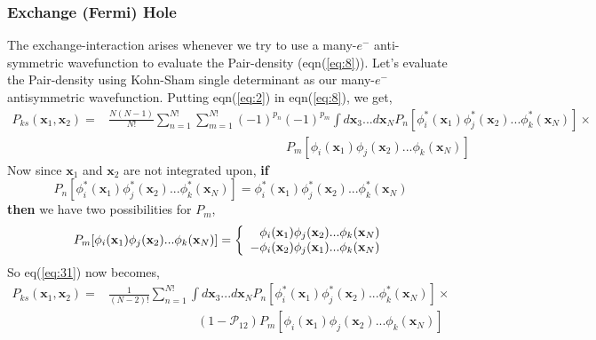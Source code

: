 \documentclass{article}
\begin{document}
\begin{Large}
\begin{flushleft}
   \subsubsection*{\Large{Exchange (Fermi) Hole}}
   The exchange-interaction arises whenever we try to use a many-$e^-$ anti-symmetric wavefunction to evaluate the Pair-density (eqn(\ref{eq:8})). Let's evaluate the Pair-density using Kohn-Sham single determinant as our many-$e^-$ antisymmetric wavefunction. Putting eqn(\ref{eq:2}) in eqn(\ref{eq:8}), we get,
   \begin{equation}\label{eq:31}
  \begin{split}
  P_{ks}(\textbf{x}_1,\textbf{x}_2) = &\frac{N(N-1)}{N!}\sum_{n=1}^{N!}\sum_{m=1}^{N!}(-1)^{p_n}(-1)^{p_m}\displaystyle{\int}d\textbf{x}_3...d\textbf{x}_N P_n[\phi_i^*(\textbf{x}_1)\phi_j^*(\textbf{x}_2)...\phi_k^*(\textbf{x}_N)]\times\\&\hspace{6cm}P_m[\phi_i(\textbf{x}_1)\phi_j(\textbf{x}_2)...\phi_k(\textbf{x}_N)] 
  \end{split}  
  \end{equation}
  Now since $\textbf{x}_1$ and $\textbf{x}_2$ are not integrated upon, \textbf{if} 
  \begin{equation}\label{eq:32}
   P_n[\phi^*_i(\textbf{x}_1)\phi^*_j(\textbf{x}_2)...\phi^*_k(\textbf{x}_N)] = \phi^*_i(\textbf{x}_1)\phi^*_j(\textbf{x}_2)...\phi^*_k(\textbf{x}_N)
  \end{equation}
  \textbf{then} we have two possibilities for $P_m$, 
  \begin{equation}\label{eq:33}
  P_m[\phi_i(\textbf{x}_1)\phi_j(\textbf{x}_2)...\phi_k(\textbf{x}_N)] = 
  \left\{
  \begin{array}{rcrcrc@{\qquad}l}
  \phi_i(\textbf{x}_1)\phi_j(\textbf{x}_2)...\phi_k(\textbf{x}_N) \\
  -\phi_i(\textbf{x}_2)\phi_j(\textbf{x}_1)...\phi_k(\textbf{x}_N)\\
  \end{array}
  \right.
  \end{equation}     
  So eq(\ref{eq:31}) now becomes,
  \begin{equation}\label{eq:34}
  \begin{split}
  P_{ks}(\textbf{x}_1,\textbf{x}_2) = &\frac{1}{(N-2)!}\sum_{n=1}^{N!}\displaystyle{\int}d\textbf{x}_3...d\textbf{x}_N P_n[\phi_i^*(\textbf{x}_1)\phi_j^*(\textbf{x}_2)...\phi_k^*(\textbf{x}_N)]\times\\&\hspace{3cm}(1- \mathcal{P}_{12})P_m[\phi_i(\textbf{x}_1)\phi_j(\textbf{x}_2)...\phi_k(\textbf{x}_N)] 

\end{split}
\end{equation}
\end{flushleft}
\end{Large}
\end{document}
